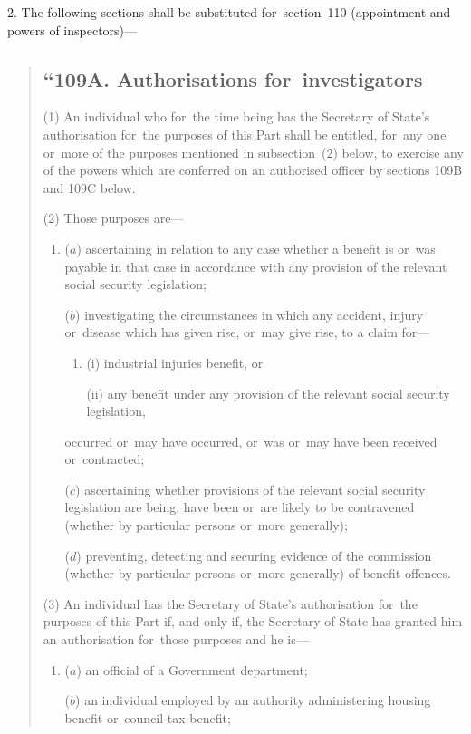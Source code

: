 \documentclass[12pt,a4paper]{article}
\begin{document}
2. The following sections shall be substituted for~section~110 (appointment and powers of inspectors)—
\begin{quotation}
\subsection*{“109A. Authorisations for~investigators}

(1) An individual who for~the time being has the Secretary of State’s authorisation for~the purposes of this Part shall be entitled, for~any one or~more of the purposes mentioned in subsection~(2)  below, to exercise any of the powers which are conferred on an authorised officer by sections 109B and 109C below.

(2) Those purposes are—
\begin{enumerate}\item[]
($a$) ascertaining in relation to any case whether a benefit is or~was payable in that case in accordance with any provision of the relevant social security legislation;

($b$) investigating the circumstances in which any accident, injury or~disease which has given rise, or~may give rise, to a claim for—
\begin{enumerate}\item[]
(i) industrial injuries benefit, or

(ii) any benefit under any provision of the relevant social security legislation,
\end{enumerate}
occurred or~may have occurred, or~was or~may have been received or~contracted;

($c$) ascertaining whether provisions of the relevant social security legislation are being, have been or~are likely to be contravened (whether by particular persons or~more generally);

($d$) preventing, detecting and securing evidence of the commission (whether by particular persons or~more generally) of benefit offences.
\end{enumerate}

(3) An individual has the Secretary of State’s authorisation for~the purposes of this Part if, and only if, the Secretary of State has granted him an authorisation for~those purposes and he is—
\begin{enumerate}\item[]
($a$) an official of a Government department;

($b$) an individual employed by an authority administering housing benefit or~council tax benefit;


\end{enumerate}
\end{quotation}
\end{document}

